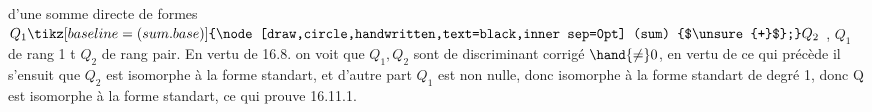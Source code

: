 
d'une somme directe de formes $Q_1 \tikz[baseline=(sum.base)]{\node[draw,circle,handwritten,text=black,inner sep=0pt] (sum) {$\unsure{+}$};} Q_2$ , $Q_1$ de rang 1 t $Q_2$ de rang pair.
En vertu de 16.8. on voit que $Q_1,Q_2$ sont de discriminant corrigé
$\hand{\neq} 0$, en vertu de ce qui précède il s'ensuit que $Q_2$ est isomorphe à la
forme standart, et d'autre part $Q_1$ est non nulle, donc isomorphe à la
forme standart de degré 1, donc Q est isomorphe à la forme standart, ce
qui prouve 16.11.1.

